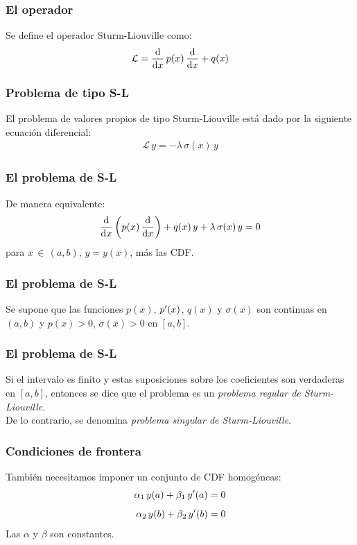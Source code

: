 \documentclass[12pt]{beamer}
\begin{document}
\begin{frame}
\frametitle{El operador}
Se define el operador Sturm-Liouville como:
\pause
\begin{align}
\mathcal{L} = \dv{x} \, p(x) \, \dv{x} + q(x)
\label{eq:ecuacion_04_02}
\end{align}
\end{frame}
\begin{frame}
\frametitle{Problema de tipo S-L}
El problema de valores propios de tipo Sturm-Liouville está dado por la siguiente ecuación diferencial:
\pause
\begin{align*}
\mathcal{L} \, y = - \lambda \, \sigma(x) \, y
\end{align*}
\end{frame}
\begin{frame}
\frametitle{El problema de S-L}
De manera equivalente:
\pause
\begin{align}
\dv{x} \left( p(x) \, \dv{x} \right) + q(x) \, y + \lambda \, \sigma (x) \, y = 0
\label{eq:ecuacion_04_03}
\end{align}
para $x \, \in \, (a, b)$, $y = y (x)$, más las CDF.
\end{frame}
\begin{frame}
\frametitle{El problema de S-L}    
Se supone que las funciones $p (x)$, ${p}^{\prime} (x)$, $q (x)$ y $\sigma (x)$ son continuas en $(a, b)$ y $p (x) > 0$, $\sigma (x) > 0$ en $[a , b]$.
\end{frame}
\begin{frame}
\frametitle{El problema de S-L}    
Si el intervalo es finito y estas suposiciones sobre los coeficientes son verdaderas en $[a, b]$, entonces se dice que el problema es un \emph{problema regular de Sturm-Liouville}.
\\
\bigskip
\pause
De lo contrario, se denomina \emph{problema singular de Sturm-Liouville}.
\end{frame}
\begin{frame}
\frametitle{Condiciones de frontera}
También necesitamos imponer un conjunto de CDF homogéneas:
\pause
\begin{align}
\begin{aligned}
\alpha_{1} \, y(a) + \beta_{1} \, {y}^{\prime} (a) &= 0 \\[0.5em]
\alpha_{2} \, y(b) + \beta_{2} \, {y}^{\prime} (b) &= 0
\end{aligned}
\label{eq:ecuacion_04_04}
\end{align}
Las $\alpha$ y $\beta$ son constantes.
\end{frame}
\end{document}
